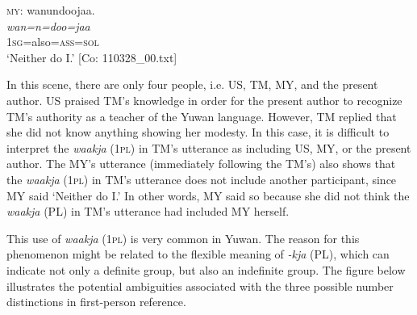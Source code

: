\textsc{my}: \glll  wanundoojaa.\\
\textit{wan=n=doo=jaa}\\
1\textsc{sg}=also=\textsc{ass}=\textsc{sol}\\
\glt {} ‘Neither do I.’ [Co: 110328\_00.txt]
\z

\noindent In this scene, there are only four people, i.e. US, TM, MY, and the present author. US praised TM’s knowledge in order for the present author to recognize TM’s authority as a teacher of the Yuwan language. However, TM replied that she did not know anything showing her modesty. In this case, it is difficult to interpret the \textit{waakja} (1\textsc{pl}) in TM’s utterance as including US, MY, or the present author. The MY’s utterance (immediately following the TM’s) also shows that the \textit{waakja} (1\textsc{pl}) in TM’s utterance does not include another participant, since MY said ‘Neither do I.’ In other words, MY said so because she did not think the \textit{waakja} (PL) in TM's utterance had included MY herself.

This use of \textit{waakja} (1\textsc{pl}) is very common in Yuwan. The reason for this phenomenon might be related to the flexible meaning of \textit{{}-kja} (PL), which can indicate not only a definite group, but also an indefinite group. The figure below illustrates the potential ambiguities associated with the three possible number distinctions in first-person reference.



